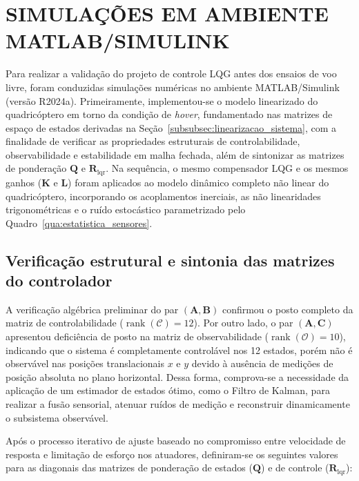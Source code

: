 \section{SIMULAÇÕES EM AMBIENTE MATLAB/SIMULINK}\label{sec:res_simulacoes}

Para realizar a validação do projeto de controle LQG antes dos ensaios de voo livre, foram conduzidas simulações numéricas no ambiente MATLAB/Simulink (versão R2024a). Primeiramente, implementou-se o modelo linearizado do quadricóptero em torno da condição de \textit{hover}, fundamentado nas matrizes de espaço de estados derivadas na Seção~\ref{subsubsec:linearizacao_sistema}, com a finalidade de verificar as propriedades estruturais de controlabilidade, observabilidade e estabilidade em malha fechada, além de sintonizar as matrizes de ponderação $\mathbf{Q}$ e $\mathbf{R}_{\mathrm{lqr}}$. Na sequência, o mesmo compensador LQG e os mesmos ganhos ($\mathbf{K}$ e $\mathbf{L}$) foram aplicados ao modelo dinâmico completo não linear do quadricóptero, incorporando os acoplamentos inerciais, as não linearidades trigonométricas e o ruído estocástico parametrizado pelo Quadro~\ref{qua:estatistica_sensores}.

\subsection{Verificação estrutural e sintonia das matrizes do controlador}\label{subsec:res_sintonia}

A verificação algébrica preliminar do par $(\mathbf{A}, \mathbf{B})$ confirmou o posto completo da matriz de controlabilidade ($\operatorname{rank}(\mathcal{C}) = 12$). Por outro lado, o par $(\mathbf{A}, \mathbf{C})$ apresentou deficiência de posto na matriz de observabilidade ($\operatorname{rank}(\mathcal{O}) = 10$), indicando que o sistema é completamente controlável nos 12 estados, porém não é observável nas posições translacionais $x$ e $y$ devido à ausência de medições de posição absoluta no plano horizontal. Dessa forma, comprova-se a necessidade da aplicação de um estimador de estados ótimo, como o Filtro de Kalman, para realizar a fusão sensorial, atenuar ruídos de medição e reconstruir dinamicamente o subsistema observável.

Após o processo iterativo de ajuste baseado no compromisso entre velocidade de resposta e limitação de esforço nos atuadores, definiram-se os seguintes valores para as diagonais das matrizes de ponderação de estados ($\mathbf{Q}$) e de controle ($\mathbf{R}_{\mathrm{lqr}}$):

